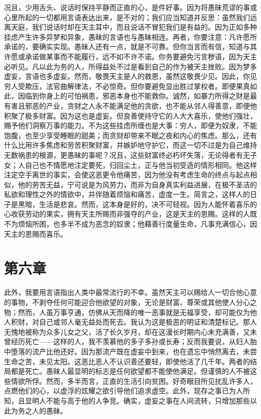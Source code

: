 况且，少用舌头、说话时保持平静而正直的心，是件好事。因为将愚昧荒谬的事或心里所起的一切都用言语表达出来，是不对的；我们应当知道并反思：虽然我们远离天庭，我们说话时却在天主耳中，而且说话不冒犯我们是有益的。因为正如多种挂虑产生许多异梦和异象，愚昧的言语也与愚昧相连。再者，你要注意：凡许愿所承诺的，要确实实现。愚昧人还有一点，就是不可靠。但你当言而有信，知道与其许愿或承诺做某事而不能履行，远不如不许不诺。你务要避免污言秽语，因为天主必听见。凡以此为务的人，所得益处不过是看到自己的作为被天主挫败。因为梦多虚妄，言语也多虚妄。然而，敬畏天主是人的救恩，虽然这敬畏少见。因此，你见穷人受欺压，法官曲解律法，不必惊奇。但你要避免显出胜过掌权者。即便果真如此，因临到你身上的可怕祸患，邪恶本身也不能救你。诚然，如暴力所得之财是最有害且邪恶的产业，贪财之人永不能满足他的贪欲，也不能从邻人得善意，即便他积聚了极多财富。因为这也是虚妄。但良善使持守它的人大大喜乐，使他们强壮，赐予他们洞察万事的能力。不为这些挂虑所缠也是大事：穷人，即便为奴隶，不能饱腹，也至少享受睡眠的甜美；而贪财却带来不眠之夜和内心的焦虑。那么，还有什么比用许多焦虑和劳苦积聚财富，并嫉妒地守护它，而这一切不过是为自己维持无数祸患的根源，更愚昧的事呢？况且，这些财富终必朽坏失落，无论得者有无子女；人自己也不情愿地注定要死，归回尘土，正与他当初受造的情形相同。他这样注定空手离世的事实，会使这恶更令他痛苦，因为他没有考虑生命的终点与起点相似，他的劳苦无益，宁可说是为风劳力，而非为自身真实利益进展，在极不圣洁的私欲和理性之外的情欲中，并伴随着烦恼和痛苦，虚度一生。简言之，这样人的日子是黑暗，生活是悲哀。然而，这本身是好的，决不可轻视。因为人能怀着喜乐的心收获劳动的果实，拥有天主所赐而非强夺的产业，这是天主的恩赐。这样的人既不为烦恼所困，也多半不成为恶念的奴隶；他藉善行度量生命，凡事充满信心，因天主的恩赐而喜乐。\par


\section{第六章}

此外，我要用言语指出人类中最常流行的不幸。虽然天主可以赐给人一切合他心意的事物，不剥夺任何可能迎合他欲望的对象，无论是财富、尊荣或其他使人分心之物；然而，人虽万事亨通，仿佛从天而降的唯一恶事就是无福享受，却可能仅为他人积财，对自己或邻人毫无益处而死去。我认为这是极恶的明证和清楚标记。那人无愧地被称为众多儿女之父，活了长久岁月，却在这漫长时期内心未充满善，又未曾经历死亡——这样的人，我不羡慕他的多子多孙或长寿；反而我要说，从妇人胎中堕落的流产比他还好。因为那流产既在虚妄中到来，也在遗忘中悄然离去，未尝生命之苦，未见太阳。这恶比恶人不认识善还要轻，即使他活了几千年。两者的结局都是死亡。愚昧人最显明的标志是任何欲望都不能使他满足。但谨慎的人不被这些情欲所俘。然而，多半而言，正直的生活引向贫困。好奇眼目所见扰乱许多人，点燃他们的心，以虚浮的炫耀之欲引导他们追求虚空。此外，现存之事已为人所知，且显明人不能与高于他的人争竞。确实，虚妄之事在人间流转，只增加那些以此为务之人的愚昧。\par

